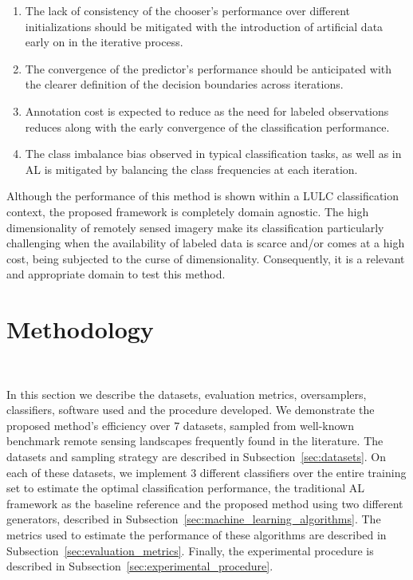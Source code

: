 \documentclass[parskip=full]{scrartcl}
\begin{document}
\begin{enumerate}
    \item The lack of consistency of the chooser's performance over different initializations should
        be mitigated with the introduction of artificial data early on in the iterative process.
    \item The convergence of the predictor's performance should be anticipated with the clearer
        definition of the decision boundaries across iterations.
    \item Annotation cost is expected to reduce as the need for labeled observations reduces along
        with the early convergence of the classification performance.
    \item The class imbalance bias observed in typical classification tasks, as well as in AL is
        mitigated by balancing the class frequencies at each iteration.
\end{enumerate}

Although the performance of this method is shown within a LULC classification
context, the proposed framework is completely domain agnostic. The high
dimensionality of remotely sensed imagery make its classification particularly
challenging when the availability of labeled data is scarce and/or comes at a
high cost, being subjected to the curse of dimensionality. Consequently, it is a
relevant and appropriate domain to test this method.

\section{Methodology}~\label{sec:methodology}

In this section we describe the datasets, evaluation metrics, oversamplers,
classifiers, software used and the procedure developed. We demonstrate the
proposed method's efficiency over 7 datasets, sampled from well-known benchmark
remote sensing landscapes frequently found in the literature. The datasets and
sampling strategy are described in Subsection~\ref{sec:datasets}. On each of
these datasets, we implement 3 different classifiers over the entire training
set to estimate the optimal classification performance, the traditional AL
framework as the baseline reference and the proposed method using two different
generators, described in Subsection~\ref{sec:machine_learning_algorithms}. The
metrics used to estimate the performance of these algorithms are described in
Subsection~\ref{sec:evaluation_metrics}. Finally, the experimental procedure is
described in Subsection~\ref{sec:experimental_procedure}. 
\end{document}
